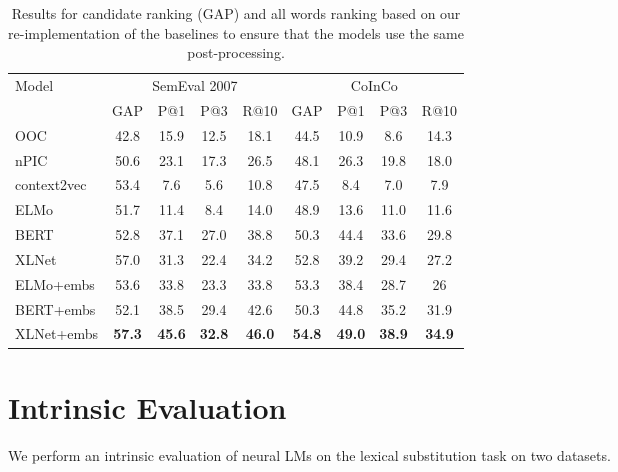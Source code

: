 \documentclass[11pt,a4paper]{article}
\begin{document}
\begin{table*}[!t]
\footnotesize 
\begin{center}
\begin{tabular}{|l|c|c|c|c|c|c|c|c|}
\hline
\multirow{2}{*}{Model} & \multicolumn{4}{c|}{SemEval 2007} & \multicolumn{4}{c|}{CoInCo} \\ \cline{2-9} 
            & GAP  & P@1  & P@3  & R@10 & GAP  & P@1  & P@3  & R@10 \\ \hline
OOC         & 42.8 & 15.9 & 12.5  & 18.1    & 44.5 & 10.9 & 8.6  & 14.3  \\ \hline
nPIC        & 50.6 & 23.1 & 17.3 & 26.5 & 48.1 & 26.3 & 19.8 & 18.0  \\ \hline

context2vec & 53.4 & 7.6 & 5.6 & 10.8 & 47.5 & 8.4  & 7.0 & 7.9  \\ \hline
\hline

ELMo & 51.7 & 11.4 & 8.4  & 14.0 & 48.9 & 13.6 & 11.0 & 11.6  \\ \hline
BERT & 52.8 & 37.1 & 27.0 & 38.8 & 50.3 & 44.4 & 33.6 & 29.8  \\ \hline
XLNet & 57.0 & 31.3 & 22.4 & 34.2 & 52.8 & 39.2 & 29.4 & 27.2  \\ \hline
ELMo+embs & 53.6 & 33.8 & 23.3 & 33.8 & 53.3 & 38.4 & 28.7 & 26 \\ \hline
BERT+embs & 52.1 & 38.5 & 29.4 & 42.6 & 50.3 & 44.8 & 35.2 & 31.9   \\ \hline
XLNet+embs &  \textbf{57.3} & \textbf{45.6} & \textbf{32.8} & \textbf{46.0} & \textbf{54.8} & \textbf{49.0} & \textbf{38.9} & \textbf{34.9}  \\ \hline

\end{tabular}
\caption{Results for candidate ranking (GAP) and all words ranking based on our re-implementation of the baselines to ensure that the models use the same post-processing.}
\label{tab:eval_res}
\end{center}
\end{table*}

\section{Intrinsic Evaluation}
\label{sec:intrinsic_eval}

We perform an intrinsic evaluation of neural LMs  on the lexical substitution task on two datasets. 
\end{document}
